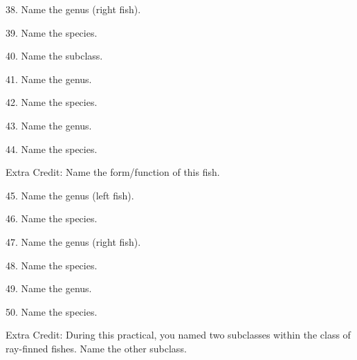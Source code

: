 \documentclass{article}
\begin{document}
{38. Name the genus (right fish).
\vspace{0.5\baselineskip}

39. Name the species.
\vspace{2\baselineskip}
%

40. Name the subclass.
\vspace{0.5\baselineskip}

41. Name the genus.
\vspace{0.5\baselineskip}

42. Name the species.
\vspace{2\baselineskip}
%

43. Name the genus.
\vspace{0.5\baselineskip}

44. Name the species.
\vspace{0.5\baselineskip}

Extra Credit: Name the form/function of this fish.
\vspace{2\baselineskip}
%


45. Name the genus (left fish).
\vspace{0.5\baselineskip}

46. Name the species.
\vspace{2\baselineskip}
%

47. Name the genus (right fish).
\vspace{0.5\baselineskip}

48. Name the species.
\vspace{2\baselineskip}
%

49. Name the genus.
\vspace{0.5\baselineskip}

50. Name the species.
\vspace{0.5\baselineskip}

Extra Credit: During this practical, you named two subclasses within the class of ray-finned fishes. Name the other subclass. 

}%
\end{document}
